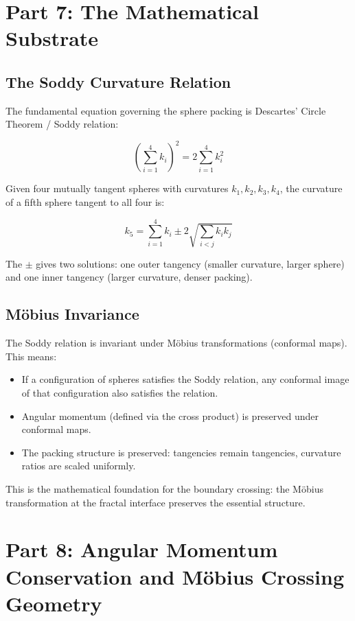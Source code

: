 \documentclass[11pt,a4paper]{article}
\begin{document}
\section{Part 7: The Mathematical Substrate}

\subsection{The Soddy Curvature Relation}

The fundamental equation governing the sphere packing is Descartes' Circle Theorem / Soddy relation:

\[
\boxed{\left(\sum_{i=1}^4 k_i\right)^2 = 2\sum_{i=1}^4 k_i^2}
\]

Given four mutually tangent spheres with curvatures $k_1, k_2, k_3, k_4$, the curvature of a fifth sphere tangent to all four is:

\[
k_5 = \sum_{i=1}^4 k_i \pm 2\sqrt{\sum_{i<j} k_i k_j}
\]

The $\pm$ gives two solutions: one outer tangency (smaller curvature, larger sphere) and one inner tangency (larger curvature, denser packing).

\subsection{Möbius Invariance}

The Soddy relation is invariant under Möbius transformations (conformal maps). This means:

\begin{itemize}
\item If a configuration of spheres satisfies the Soddy relation, any conformal image of that configuration also satisfies the relation.
\item Angular momentum (defined via the cross product) is preserved under conformal maps.
\item The packing structure is preserved: tangencies remain tangencies, curvature ratios are scaled uniformly.
\end{itemize}

This is the mathematical foundation for the boundary crossing: the Möbius transformation at the fractal interface preserves the essential structure.

\section{Part 8: Angular Momentum Conservation and Möbius Crossing Geometry}
\end{document}

